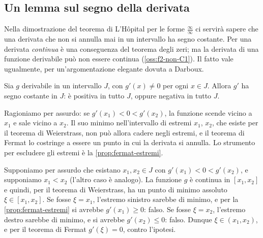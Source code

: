 \subsection{Un lemma sul segno della derivata}

Nella dimostrazione del teorema di L'Hôpital per le forme $\frac\infty\infty$ ci servirà
sapere che una derivata che non si annulla mai in un intervallo ha segno costante. Per
una derivata \emph{continua} è una conseguenza del teorema degli zeri; ma la derivata di
una funzione derivabile può non essere continua (\cref{oss:f2-non-C1}). Il fatto vale
ugualmente, per un'argomentazione elegante dovuta a Darboux.

\begin{lemma}[di Darboux]\label{lem:darboux}
Sia $g$ derivabile in un intervallo $J$, con $g'(x)\neq0$ per ogni $x\in J$. Allora
$g'$ ha segno costante in $J$: è positiva in tutto $J$, oppure negativa in tutto $J$.
\end{lemma}

\begin{schema}
\end{schema}

\begin{strategia}
Ragioniamo per assurdo: se $g'(x_{1})<0<g'(x_{2})$, la funzione scende vicino a $x_{1}$ e
sale vicino a $x_{2}$. Il suo minimo nell'intervallo di estremi $x_{1}$, $x_{2}$, che
esiste per il teorema di Weierstrass, non può allora cadere negli estremi, e il teorema
di Fermat lo costringe a essere un punto in cui la derivata si annulla. Lo strumento per
escludere gli estremi è la \cref{prop:fermat-estremi}.
\end{strategia}

\begin{dimostrazione}
Supponiamo per assurdo che esistano $x_{1},x_{2}\in J$ con $g'(x_{1})<0<g'(x_{2})$, e
supponiamo $x_{1}<x_{2}$ (l'altro caso è analogo). La funzione $g$ è continua in
$[x_{1},x_{2}]$ e quindi, per il teorema di Weierstrass, ha un punto di minimo assoluto
$\xi\in[x_{1},x_{2}]$. Se fosse $\xi=x_{1}$, l'estremo sinistro sarebbe di minimo, e per
la \cref{prop:fermat-estremi} si avrebbe $g'(x_{1})\ge0$: falso. Se fosse $\xi=x_{2}$,
l'estremo destro sarebbe di minimo, e si avrebbe $g'(x_{2})\le0$: falso. Dunque
$\xi\in(x_{1},x_{2})$, e per il teorema di Fermat $g'(\xi)=0$, contro l'ipotesi.
\end{dimostrazione}

